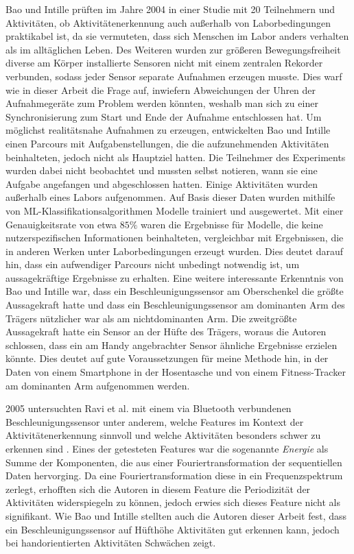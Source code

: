 Bao und Intille prüften im Jahre 2004 in einer Studie mit 20 Teilnehmern und Aktivitäten, ob Aktivitätenerkennung auch außerhalb von Laborbedingungen praktikabel ist, da sie vermuteten, dass sich Menschen im Labor anders verhalten als im alltäglichen Leben. Des Weiteren wurden zur größeren Bewegungsfreiheit diverse am Körper installierte Sensoren nicht mit einem zentralen Rekorder verbunden, sodass jeder Sensor separate Aufnahmen erzeugen musste. Dies warf wie in dieser Arbeit die Frage auf, inwiefern Abweichungen der Uhren der Aufnahmegeräte zum Problem werden könnten, weshalb man sich zu einer Synchronisierung zum Start und Ende der Aufnahme entschlossen hat.
Um möglichst realitätsnahe Aufnahmen zu erzeugen, entwickelten Bao und Intille einen Parcours mit Aufgabenstellungen, die die aufzunehmenden Aktivitäten beinhalteten, jedoch nicht als Hauptziel hatten. Die Teilnehmer des Experiments wurden dabei nicht beobachtet und mussten selbst notieren, wann sie eine Aufgabe angefangen und abgeschlossen hatten. Einige Aktivitäten wurden außerhalb eines Labors aufgenommen. Auf Basis dieser Daten wurden mithilfe von ML-Klassifikationsalgorithmen Modelle trainiert und ausgewertet. Mit einer Genauigkeitsrate von etwa $85 \%$ waren die Ergebnisse für Modelle, die keine nutzerspezifischen Informationen beinhalteten, vergleichbar mit Ergebnissen, die in anderen Werken unter Laborbedingungen erzeugt wurden. Dies deutet darauf hin, dass ein aufwendiger Parcours nicht unbedingt notwendig ist, um aussagekräftige Ergebnisse zu erhalten.
Eine weitere interessante Erkenntnis von Bao und Intille war, dass ein Beschleunigungssensor am Oberschenkel die größte Aussagekraft hatte und dass ein Beschleunigungssensor am dominanten Arm des Trägers nützlicher war als am nichtdominanten Arm. Die zweitgrößte Aussagekraft hatte ein Sensor an der Hüfte des Trägers, woraus die Autoren schlossen, dass ein am Handy angebrachter Sensor ähnliche Ergebnisse erzielen könnte. Dies deutet auf gute Voraussetzungen für meine Methode hin, in der Daten von einem Smartphone in der Hosentasche und von einem Fitness-Tracker am dominanten Arm aufgenommen werden.

2005 untersuchten Ravi et al. mit einem via Bluetooth verbundenen Beschleunigungssensor unter anderem, welche Features im Kontext der Aktivitätenerkennung sinnvoll und welche Aktivitäten besonders schwer zu erkennen sind \cite{Ravi2005}. Eines der getesteten Features war die sogenannte \textit{Energie} als Summe der Komponenten, die aus einer Fouriertransformation der sequentiellen Daten hervorging. Da eine Fouriertransformation diese in ein Frequenzspektrum zerlegt, erhofften sich die Autoren in diesem Feature die Periodizität der Aktivitäten widerspiegeln zu können, jedoch erwies sich dieses Feature nicht als signifikant. Wie Bao und Intille stellten auch die Autoren dieser Arbeit fest, dass ein Beschleunigungssensor auf Hüfthöhe Aktivitäten gut erkennen kann, jedoch bei handorientierten Aktivitäten Schwächen zeigt.

